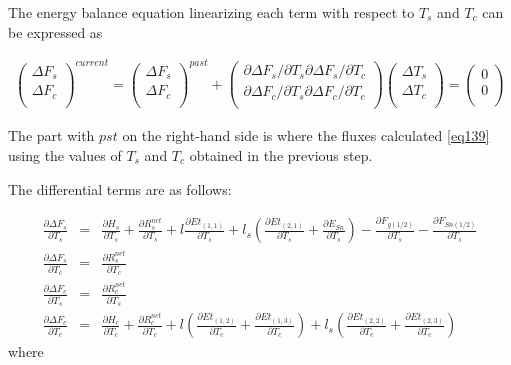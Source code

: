 The energy balance equation linearizing each term with respect to \(T_s\) and \(T_c\) can be expressed as

\begin{eqnarray}
 \left(
\begin{array}{l}
 \Delta F_s \\
 \Delta F_c \\
\end{array}
\right)^{current}
=
\left(
\begin{array}{l}
 \Delta F_s \\
 \Delta F_c \\
\end{array}
\right)^{past}
+
\left(
\begin{array}{ll}
 {\partial \Delta F_s}/{\partial T_s}
 {\partial \Delta F_s}/{\partial T_c} \\
 {\partial \Delta F_c}/{\partial T_s}
 {\partial \Delta F_c}/{\partial T_c} \\
\end{array}
\right)
\left(
\begin{array}{l}
 \Delta T_s \\
 \Delta T_c \\
\end{array}
\right)
=
\left(
\begin{array}{l}
 0 \\
 0 \\
\end{array}
\right) \label{eq140}
\end{eqnarray}

The part with \(pst\) on the right-hand side is where the fluxes calculated \ref{eq139} using the values of \(T_s\) and \(T_c\) obtained in the previous step.

The differential terms are as follows:

\begin{eqnarray}
 \frac{\partial \Delta F_s}{\partial T_s} &=&
 \frac{\partial H_s}{\partial T_s}
+\frac{\partial R^{net}_s}{\partial T_s}
+l\frac{\partial Et_{(1,1)}}{\partial T_s}
+l_s\left(\frac{\partial Et_{(2,1)}}{\partial T_s}
+    \frac{\partial E_{Sn}}{\partial T_s}\right)
-\frac{\partial F_{g(1/2)}}{\partial T_s}
-\frac{\partial F_{Sn(1/2)}}{\partial T_s} \\
 \frac{\partial \Delta F_s}{\partial T_c} &=&
 \frac{\partial R^{net}_s}{\partial T_c} \\
 \frac{\partial \Delta F_c}{\partial T_s} &=&
 \frac{\partial R^{net}_c}{\partial T_s} \\
 \frac{\partial \Delta F_c}{\partial T_c} &=&
 \frac{\partial H_c}{\partial T_c}
+\frac{\partial R^{net}_c}{\partial T_c}
+l  \left(\frac{\partial Et_{(1,2)}}{\partial T_c}
+         \frac{\partial Et_{(1,3)}}{\partial T_c}\right)
+l_s\left(\frac{\partial Et_{(2,2)}}{\partial T_c}
+         \frac{\partial Et_{(2,3)}}{\partial T_c}\right)
\end{eqnarray} where

